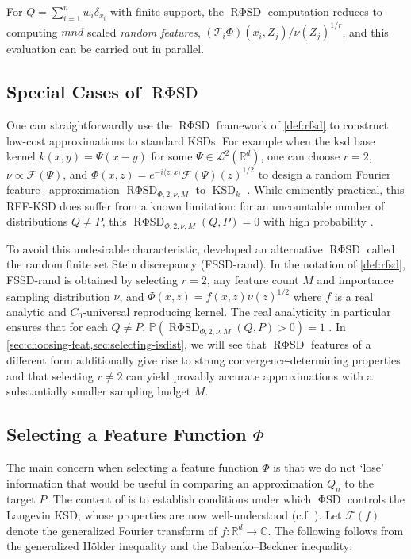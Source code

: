 \documentclass[12pt,paper=letter]{scrreprt}
\def\mbb#1{\mathbb{#1}}
\newcommand{\inner}[2]{\langle{#1},{#2}\rangle} %
\def\P{\mbb{P}} %
\newcommand{\opsub}[1]{\mathcal{T}_{#1}} %
\newcommand{\KSD}{\ensuremath{\operatorname{KSD}}\xspace}
\newcommand{\FTop}[0]{\mathscr{F}} %
\newcommand{\feat}{\Phi} %
\newcommand{\basekernel}{k}  %
\newcommand{\FSD}{\ensuremath{\operatorname{\mathrm{\Phi}SD}}\xspace}
\newcommand{\RFSD}{\ensuremath{\operatorname{R\mathrm{\Phi}SD}}\xspace}
\newcommand{\isdist}{\nu}
\begin{document}
\noindent For $Q = \sum_{i=1}^n w_i \delta_{x_i}$ with finite support, the \RFSD computation reduces to computing $mnd$ scaled \emph{random features}, $(\opsub{i}{\feat})(x_i, Z_j)/\isdist(Z_j)^{1/r}$, and this evaluation can be carried out in parallel.

\subsection{Special Cases of $\RFSD$}

One can straightforwardly use the $\RFSD$ framework of \cref{def:rfsd} to construct low-cost approximations to standard KSDs. 
For example when the \ac{ksd} base kernel $k(x,y) = \Psi(x-y)$ for some $\Psi \in \mathcal{L}^2(\mathbb{R}^d)$, one can choose $r=2$, $\nu\propto \FTop(\Psi)$, and $\feat(x,z) = e^{-i\inner{z}{x}}\FTop(\Psi)(z)^{1/2}$ to design a random Fourier feature~\citep[RFF]{rahimi2007random} approximation $\RFSD_{\feat,2,\isdist,M}$ to $\KSD_{\basekernel}$ \citep{huggins2018random}. 
While eminently practical, this RFF-KSD does suffer from a known limitation: for an uncountable number of distributions $Q\neq P$, this $\RFSD_{\feat,2,\isdist,M}(Q,P) = 0$ with high probability \citep[Prop. 1]{chwialkowski2015fast}.

To avoid this undesirable characteristic, \citet{jitkrittum2017linear} developed an alternative $\RFSD$ called the random finite set Stein discrepancy (FSSD-rand). 
In the notation of \cref{def:rfsd}, FSSD-rand is obtained by selecting $r=2$, any feature count $M$ and importance sampling distribution $\isdist$, and $\feat(x,z) = f(x,z) \isdist(z)^{1/2}$ where $f$ is a real analytic and $C_0$-universal \citep[Def.~4.1]{Carmeli2010} reproducing kernel. 
The real analyticity in particular ensures that for each $Q\neq P$, $\P(\RFSD_{\feat,2,\isdist,M}(Q,P) > 0) = 1$ \citep[Thm.~1]{jitkrittum2017linear}.
In \cref{sec:choosing-feat,sec:selecting-isdist}, we will see that $\RFSD$ features of a different form additionally give rise to strong convergence-determining properties and that selecting $r \neq 2$ can yield provably accurate approximations with a substantially smaller sampling budget $M$.


\subsection{Selecting a Feature Function $\feat$} \label{sec:choosing-feat}

The main concern when selecting a feature function $\feat$ is that we do not `lose' information that would be useful in comparing an approximation $Q_n$ to the target $P$.
The content of  is to establish conditions under which $\FSD$ controls the Langevin KSD, whose properties are now well-understood (c.f. ).
Let $\FTop(f)$ denote the generalized Fourier transform of $f : \mathbb{R}^d \rightarrow \mathbb{C}$.
The following follows from the generalized H\"{o}lder inequality and the Babenko--Beckner inequality:
\end{document}
